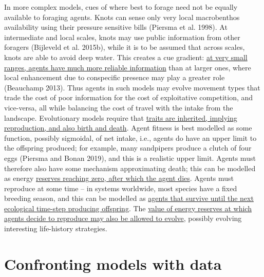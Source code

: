 \documentclass[]{scrartcl}
\begin{document}
\begin{linenumbers}
In more complex models, cues of where best to forage need not be equally
available to foraging agents. Knots can sense only very local
macrobenthos availability using their pressure sensitive bills
(\protect\hypertarget{__UnoMark__4342_580056431}{}{}Piersma et al.
1998). At intermediate and local scales, knots may use public
information from other foragers
(\protect\hypertarget{__UnoMark__4349_580056431}{}{}Bijleveld et al.
2015b), while it is to be assumed that across scales, knots are able to
avoid deep water. This creates a cue gradient: \underline{at very small
ranges, agents have much more reliable information} than at larger ones,
where local enhancement due to conspecific presence may play a greater
role (\protect\hypertarget{__UnoMark__4356_580056431}{}{}Beauchamp
2013). Thus agents in such models may evolve movement types that trade
the cost of poor information for the cost of exploitative competition,
and vice-versa, all while balancing the cost of travel with the intake
from the landscape. Evolutionary models require that \underline{traits are
inherited, implying reproduction, and also birth and death}. Agent
fitness is best modelled as some function, possibly sigmoidal, of net
intake, i.e., agents do have an upper limit to the offspring produced;
for example, many sandpipers produce a clutch of four eggs
\protect\hypertarget{__UnoMark__54262_4107183634}{}{}(\protect\hypertarget{__UnoMark__4363_580056431}{}{}Piersma
and Bonan 2019), and this is a realistic upper limit. Agents must
therefore also have some mechanism approximating death; this can be
modelled as energy \underline{reserves reaching zero, after which the agent
dies}. Agents must reproduce at some time -- in systems worldwide, most
species have a fixed breeding season, and this can be modelled as
\underline{agents that survive until the next ecological time-step producing
offspring}. The \underline{value of energy reserves at which agents decide to
reproduce may also be allowed to evolve}, possibly evolving interesting
life-history strategies.

\section{Confronting models with
data}\label{confronting-models-with-data}


\end{linenumbers}
\end{document}
